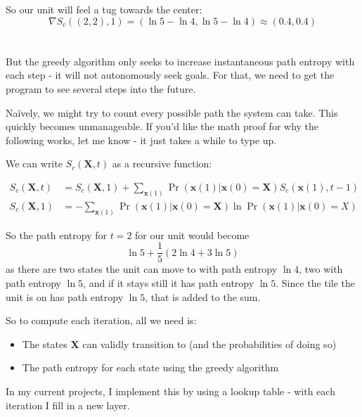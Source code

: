 \documentclass{article}
\newcommand{\tbf}[1]{\textbf{#1}}
\begin{document}
\vspace{1em}

So our unit will feel a tug towards the center:
\begin{equation}
\nabla S_c((2,2),1) = (\ln5-\ln4,\ln5-\ln4) \approx (0.4,0.4)
\end{equation}

\section{}

But the greedy algorithm only seeks to increase instantaneous path entropy with each step - it will not autonomously seek goals. For that, we need to get the program to see several steps into the future.

Na\"ively, we might try to count every possible path the system can take. This quickly becomes unmanageable. If you'd like the math proof for why the following works, let me know - it just takes a while to type up.

We can write $S_c(\tbf X,t)$ as a recursive function:

\begin{align}
S_c(\tbf X,t) &= S_c(\tbf X,1) + \sum_{\tbf x(1)} \Pr(\tbf x(1)|\tbf x(0)=\tbf X)S_c(\tbf x(1),t-1)\\
S_c(\tbf X,1) &= -\sum_{\tbf x(1)} \Pr(\tbf x(1)|\tbf x(0)=\tbf X)\ln \Pr(\tbf x(1)|\tbf x(0)=X)
\end{align}

So the path entropy for $t=2$ for our unit would become
\begin{equation}
\ln 5 + \frac15 \left( 2\ln4 + 3\ln5 \right)
\end{equation}
as there are two states the unit can move to with path entropy $\ln4$, two with path entropy $\ln5$, and if it stays still it has path entropy $\ln5$. Since the tile the unit is on has path entropy $\ln5$, that is added to the sum.

\clearpage

So to compute each iteration, all we need is:

\begin{itemize}
\item The states \tbf X can validly transition to (and the probabilities of doing so)
\item The path entropy for each state using the greedy algorithm
\end{itemize}

In my current projects, I implement this by using a lookup table - with each iteration I fill in a new layer.
\end{document}

